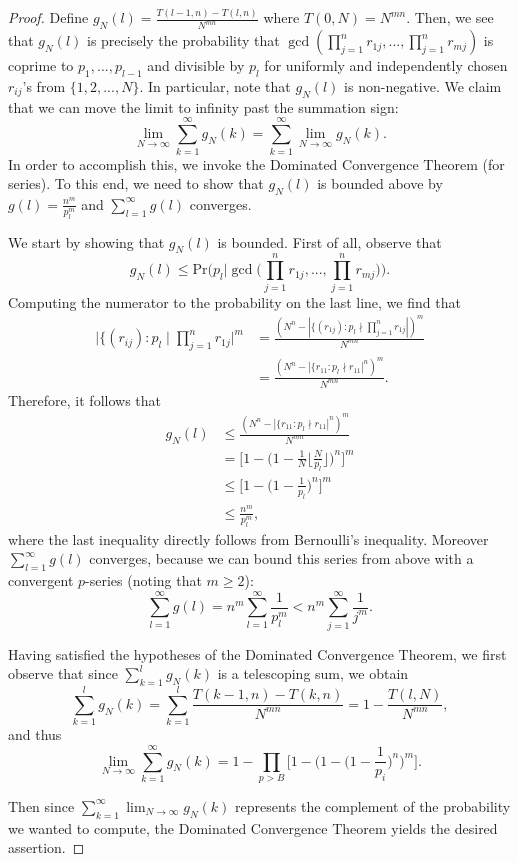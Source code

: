 \documentclass[10pt,a4paper]{article}
\theoremstyle{definition}
\theoremstyle{remark}
\begin{document}
\begin{proof}
Define $g_N(l) = \frac{T(l-1, n) - T(l, n)}{N^{mn}}$ where $T(0, N) = N^{mn}$. Then, we see that $g_N(l)$ is precisely the probability that $\gcd(\prod_{j=1}^n r_{1j}, ... , \prod_{j=1}^n r_{mj})$ is coprime to $p_1, ..., p_{l-1}$ and divisible by $p_l$ for uniformly and independently chosen $r_{ij}$'s from $\{1, 2, ..., N\}$. In particular, note that $g_N(l)$ is non-negative. We claim that we can move the limit to infinity past the summation sign:
$$\lim_{N \to \infty} \sum_{k=1}^{\infty} g_N(k) = \sum_{k=1}^{\infty} \lim_{N \to \infty} g_N(k).$$
In order to accomplish this, we invoke the Dominated Convergence Theorem (for series). To this end, we need to show that $g_N(l)$ is bounded above by $g(l) = \frac{n^m}{p_l^m}$ and $\sum_{l=1}^{\infty} g(l)$ converges.

We start by showing that $g_N(l)$ is bounded. First of all, observe that
$$g_N(l) \leq \text{Pr}\Big(p_l \Big| \gcd\Big(\prod_{j=1}^n r_{1j}, ... , \prod_{j=1}^n r_{mj}\Big)\Big).$$
Computing the numerator to the probability on the last line, we find that
\begin{align*} 
\Big|\{(r_{ij}) : p_l \mid \prod_{j=1}^n r_{1j}\Big|^m &= \frac{(N^n - |\{(r_{1j}) : p_l \nmid \prod_{j=1}^n r_{1j}|)^m}{N^{mn}}\\
&= \frac{(N^n - |\{r_{11} : p_l \nmid r_{11}|^n)^m}{N^{mn}}. \end{align*}
Therefore, it follows that
\begin{align*} 
g_N(l) &\leq \frac{(N^n - |\{r_{11} : p_l \nmid r_{11}|^n)^m}{N^{mn}}\\
&= \Big[1 - \Big(1 - \frac{1}{N} \Big\lfloor \frac{N}{p_l}\Big\rfloor\Big)^n\Big]^m\\
&\leq \Big[1 - \Big(1 - \frac{1}{p_l}\Big)^n\Big]^m\\
&\leq \frac{n^m}{p_l^m},\end{align*}
where the last inequality directly follows from Bernoulli's inequality. Moreover $\sum_{l=1}^{\infty} g(l)$ converges, because we can bound this series from above with a convergent $p$-series (noting that $m \geq 2$):
$$\sum_{l=1}^{\infty} g(l) = n^m \sum_{l=1}^{\infty} \frac{1}{p_l^m} < n^m \sum_{j=1}^{\infty} \frac{1}{j^m}.$$

Having satisfied the hypotheses of the Dominated Convergence Theorem, we first observe that since $\sum_{k=1}^l g_N(k)$ is a telescoping sum, we obtain
$$\sum_{k=1}^l g_N(k) = \sum_{k=1}^l \frac{T(k-1, n) - T(k, n)}{N^{mn}} = 1 - \frac{T(l,N)}{N^{mn}},$$ 
and thus
$$\lim_{N \to \infty} \sum_{k=1}^{\infty} g_N(k) = 1 - \prod_{p > B} \Big[1 - \Big(1 - \Big(1 - \frac{1}{p_i}  \Big)^n\Big)^m\Big].$$

\noindent Then since $\displaystyle \sum_{k=1}^{\infty} \lim_{N \to \infty} g_N(k)$ represents the complement of the probability we wanted to compute, the Dominated Convergence Theorem yields the desired assertion.
\end{proof}
\end{document}
